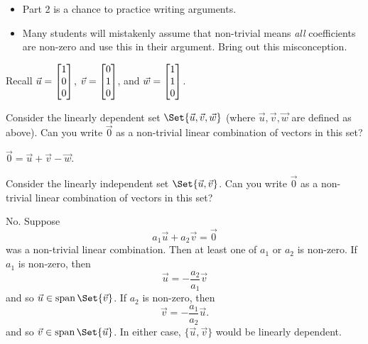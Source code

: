 	\question
	\begin{annotation}
		\begin{goals}
		\end{goals}

		\begin{notes}
			\begin{itemize}
				\item Part 2 is a chance to practice writing arguments.
				\item Many students will mistakenly assume that non-trivial means
					\emph{all} coefficients are non-zero and use this in
					their argument. Bring out this misconception.
			\end{itemize}
		\end{notes}
	\end{annotation}
		Recall $\vec u=\mat{1\\0\\0}$, $\vec v=\mat{0\\1\\0}$, and $\vec w=\mat{1\\1\\0}$.
	\begin{parts}
		\item Consider the linearly dependent
			set $\Set{\vec u,\vec v,\vec w}$ (where $\vec u,\vec v,\vec w$ are
			defined as above). Can you write $\vec 0$ as a non-trivial linear
			combination of vectors in this set?
			\begin{solution}[inline]
				$\vec 0 = \vec u + \vec v - \vec w$.
			\end{solution}
		\item Consider the linearly independent set $\Set{\vec u,\vec v}$.
			Can you write $\vec 0$ as a non-trivial linear combination of
			vectors in this set?
			\begin{solution}
				No. Suppose
				\[
					a_1 \vec u + a_2 \vec v = \vec 0
				\]
				was a non-trivial linear combination. Then at least one of $a_1$ or $a_2$
				is non-zero. If $a_1$ is non-zero, then
				\[
					\vec u = -\frac{a_2}{a_1}\vec v
				\]
				and so $\vec u\in\Span\Set{\vec v}$.
				If $a_2$ is non-zero, then
				\[
					\vec v=-\frac{a_1}{a_2}\vec u.
				\]
				and so $\vec v\in\Span\Set{\vec u}$.
				In either case, $\{\vec u,\vec v\}$ would be linearly dependent.
			\end{solution}
	\end{parts}


